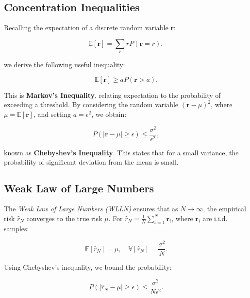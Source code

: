 \subsection{Concentration Inequalities}

Recalling the expectation of a discrete random variable $\mathbf{r}$:

\[
    \mathbb{E}[\mathbf{r}] = \sum_r r P(\mathbf{r} = r),
\]

we derive the following useful inequality:

\[
    \mathbb{E}[\mathbf{r}] \geq a P(\mathbf{r} > a).
\]

This is \textbf{Markov's Inequality}, relating expectation to the probability of exceeding a threshold. By considering the random variable $(\mathbf{r} - \mu)^2$, where $\mu = \mathbb{E}[\mathbf{r}]$, and setting $a = \epsilon^2$, we obtain:

\[
    P(|\mathbf{r} - \mu| \geq \epsilon) \leq \frac{\sigma^2}{\epsilon^2},
\]

known as \textbf{Chebyshev's Inequality}. This states that for a small variance, the probability of significant deviation from the mean is small.

\subsection{Weak Law of Large Numbers}

The \textit{Weak Law of Large Numbers (WLLN)} ensures that as $N \to \infty$, the empirical risk $\hat{r}_N$ converges to the true risk $\mu$. For $\hat{r}_N = \frac{1}{N} \sum_{i=1}^N \mathbf{r}_i$, where $\mathbf{r}_i$ are i.i.d. samples:

\[
    \mathbb{E}[\hat{r}_N] = \mu, \quad \mathbb{V}[\hat{r}_N] = \frac{\sigma^2}{N}.
\]

Using Chebyshev’s inequality, we bound the probability:

\[
    P(|\hat{r}_N - \mu| \geq \epsilon) \leq \frac{\sigma^2}{N \epsilon^2}.
\]



